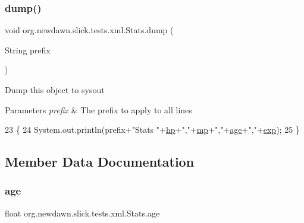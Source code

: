 \subsubsection{\texorpdfstring{dump()}{dump()}}
{\footnotesize\ttfamily void org.\+newdawn.\+slick.\+tests.\+xml.\+Stats.\+dump (\begin{DoxyParamCaption}\item[{String}]{prefix }\end{DoxyParamCaption})\hspace{0.3cm}{\ttfamily [inline]}}

Dump this object to sysout


\begin{DoxyParams}{Parameters}
{\em prefix} & The prefix to apply to all lines \\
\hline
\end{DoxyParams}

\begin{DoxyCode}
23                                     \{
24         System.out.println(prefix+\textcolor{stringliteral}{"Stats "}+\mbox{\hyperlink{classorg_1_1newdawn_1_1slick_1_1tests_1_1xml_1_1_stats_a9a971fc03aad54e0c28f9240b1acb054}{hp}}+\textcolor{stringliteral}{","}+\mbox{\hyperlink{classorg_1_1newdawn_1_1slick_1_1tests_1_1xml_1_1_stats_ae63d4660593f09ce167a78ffd878a478}{mp}}+\textcolor{stringliteral}{","}+\mbox{\hyperlink{classorg_1_1newdawn_1_1slick_1_1tests_1_1xml_1_1_stats_af7abb47cdc06bace5c39f14a90fb99f0}{age}}+\textcolor{stringliteral}{","}+\mbox{\hyperlink{classorg_1_1newdawn_1_1slick_1_1tests_1_1xml_1_1_stats_abab0dd7cf87c1901da2f37e66e27868e}{exp}});
25     \}
\end{DoxyCode}


\subsection{Member Data Documentation}
\mbox{\label{classorg_1_1newdawn_1_1slick_1_1tests_1_1xml_1_1_stats_af7abb47cdc06bace5c39f14a90fb99f0}} 
\subsubsection{\texorpdfstring{age}{age}}
{\footnotesize\ttfamily float org.\+newdawn.\+slick.\+tests.\+xml.\+Stats.\+age\hspace{0.3cm}{\ttfamily [private]}}

